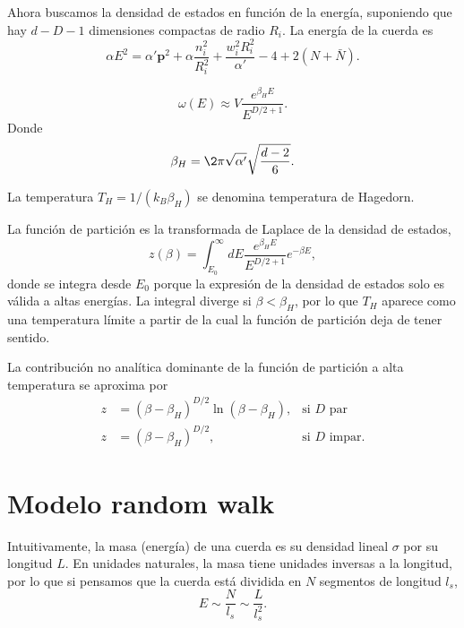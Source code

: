 Ahora buscamos la densidad de estados en función de la energía, suponiendo que hay $d-D-1$ dimensiones compactas 
de radio $R_i$.
La energía de la cuerda es
\begin{equation}
  \alpha E^2 = \alpha' \mathbf p ^2 + \alpha\frac{n^2_i}{R_i^2} + \frac{w_i^2 R^2_i}{\alpha'} -4+ 2(N+\bar N).
\end{equation}


\begin{equation}
  \omega(E) \approx V \frac{e^{\beta_H E}}{E^{D/2+1}}.
\end{equation}
Donde 
\begin{equation}
  \beta_H = \2\pi \sqrt{\alpha'}\sqrt{\frac{d-2}{6}}.
\end{equation}

La temperatura $T_H=1/(k_B \beta_H)$ se denomina temperatura de Hagedorn.

La función de partición es la transformada de Laplace de la densidad de estados,
\begin{equation}
  z(\beta)=\int^\infty_{E_0} dE \frac{e^{\beta_H E}}{{E^{D/2+1}}}e^{-\beta E},
\end{equation}
donde se integra desde $E_0$ porque la expresión de la densidad de estados solo es válida a altas
energías.
La integral diverge si $\beta < \beta_H$, por lo que $T_H$ aparece como una temperatura límite
a partir de la cual la función de partición deja de tener sentido.

La contribución no analítica dominante de la función de partición a alta temperatura se aproxima
por 
\begin{equation}
  \begin{aligned}
    z&=(\beta-\beta_H)^{D/2}\ln(\beta-\beta_H), &\text{si $D$ par}\\
    z&=(\beta-\beta_H)^{D/2}, &\text{si $D$ impar}.
  \end{aligned}
  \label{eq:zp}
\end{equation}

\section{Modelo random walk}

Intuitivamente, la masa (energía) de una cuerda es su densidad lineal $\sigma$ por su longitud $L$.
En unidades naturales, la masa tiene unidades inversas a la longitud, por lo que si pensamos
que la cuerda está dividida en $N$ segmentos de longitud $l_s$, 
\begin{equation}
  E\sim  \frac{N}{l_s} \sim \frac{L}{l_s^2}.
\end{equation}

